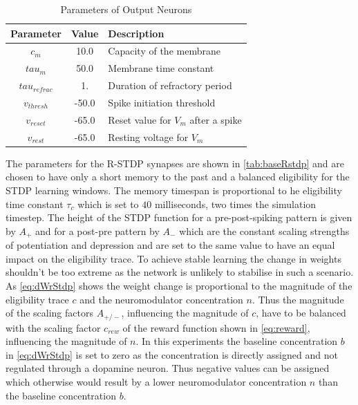 \begin{table}[htpb]
  \caption[Parameters Output Neuron]{Parameters of Output Neurons} \label{tab:outputParam}
  \centering
  \begin{tabular}{|c| c |l|}
      \toprule
      Parameter & Value & Description \\
      \midrule
      $c_m$   & 10.0  & Capacity of the membrane \\
      $tau_{m}$    & 50.0  & Membrane time constant \\
      $tau_{refrac}$   & 1.  & Duration of refractory period\\
      $v_{thresh}$   & -50.0  & Spike initiation threshold \\
      $v_{reset}$    & -65.0  &  Reset value for $V_m$ after a spike \\
      $v_{rest}$ & -65.0 & Resting voltage for $V_m$ \\
      \bottomrule
  \end{tabular}
  \end{table}

The parameters for the R-STDP synapses are shown in \autoref{tab:baseRstdp} and are chosen to have only a short memory to the past and a balanced eligibility for the STDP learning windows. The memory timespan is proportional to he eligibility time constant $\tau_c$ which is set to $40$ milliseconds, two times the simulation timestep. The height of the STDP function for a pre-post-spiking pattern is given by $A_+$ and for a post-pre pattern by $A_-$ which are the constant scaling strengths of potentiation and depression and are set to the same value to have an equal impact on the eligibility trace. To achieve stable learning the change in weights shouldn’t be too extreme as the network is unlikely to stabilise in such a scenario. As \autoref{eq:dWrStdp} shows the weight change is proportional to the magnitude of the eligibility trace $c$ and the neuromodulator concentration $n$. Thus the magnitude of the scaling factors $A_{+/-}$, influencing the magnitude of $c$,  have to be balanced with the scaling factor $c_{rew}$ of the reward function shown in \autoref{eq:reward}, influencing the magnitude of $n$. In this experiments the baseline concentration $b$ in \autoref{eq:dWrStdp} is set to zero as the concentration is directly assigned and not regulated through a dopamine neuron. Thus negative values can be assigned which otherwise would result by a lower neuromodulator concentration $n$ than the baseline concentration $b$.

